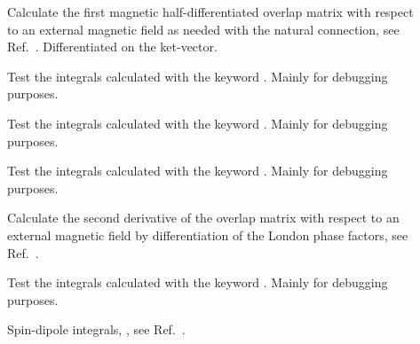 \begin{description}
\item[] Calculate the first magnetic half-differentiated overlap
matrix with respect to an external magnetic field as needed with the
natural connection, see Ref.~\cite{krthklbpjjocp195}. Differentiated on
the ket-vector.


\item[] Test the integrals calculated with the keyword
. Mainly for debugging purposes.

\item[] Test the integrals calculated with the keyword
. Mainly for debugging purposes.

\item[] Test the integrals calculated with the keyword
. Mainly for debugging purposes.

\item[] Calculate the second derivative of the overlap
matrix with respect to an external magnetic field by differentiation
of the London phase factors, see Ref.~\cite{thpjjcp95}.


\item[] Test the integrals calculated with the keyword
. Mainly for debugging purposes.

\item[] Spin-dipole integrals,
,
see Ref.~\cite{ovhapjhjajsbpthjcp96}.



\end{description}

